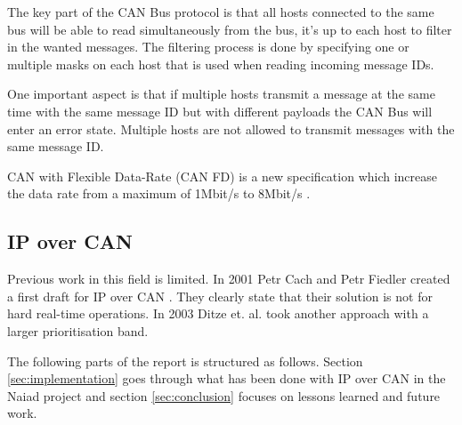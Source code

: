 The key part of the CAN Bus protocol is that all hosts connected to the same
bus will be able to read simultaneously from the bus, it's up to each host to
filter in the wanted messages. The filtering process is done by specifying one
or multiple masks on each host that is used when reading incoming message
IDs.

One important aspect is that if multiple hosts transmit a message at the same
time with the same message ID but with different payloads the CAN Bus will
enter an error state. Multiple hosts are not allowed to transmit messages with the
same message ID.

CAN with Flexible Data-Rate (CAN FD) is a new specification which increase the
data rate from a maximum of 1Mbit/s to 8Mbit/s \cite{standard:can_bus_fd}.

\subsection{IP over CAN}
Previous work in this field is limited. In 2001 Petr Cach and Petr Fiedler
created a first draft for IP over CAN \cite{web:draft-ip_over_can}. They
clearly state that their solution is not for hard real-time operations. In
2003 Ditze et. al. \cite{web:porting_ip_can} took another approach with a larger prioritisation
band.

The following parts of the report is structured as follows. Section \ref{sec:implementation}
goes through what has been done with IP over CAN in the Naiad project and section
\ref{sec:conclusion} focuses on lessons learned and future work.
